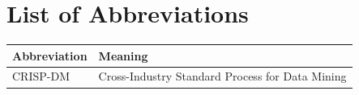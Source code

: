 \chapter*{List of Abbreviations}

\noindent
\begin{tabular}{@{}p{}p{}@{}}
\textbf{Abbreviation} & \textbf{Meaning} \\
\midrule
CRISP-DM & Cross-Industry Standard Process for Data Mining \\
\end{tabular}
